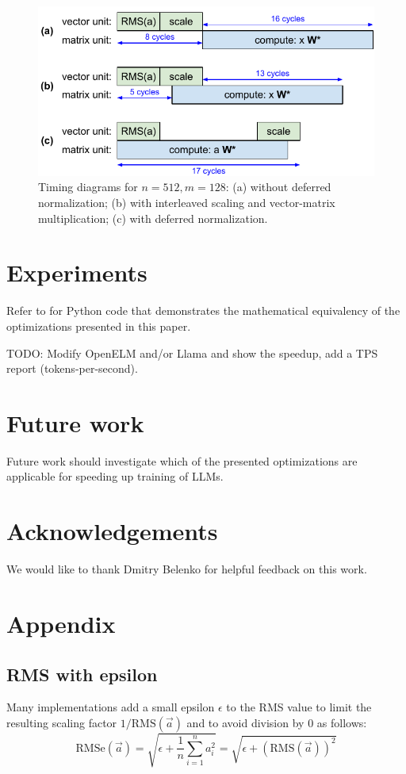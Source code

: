 \documentclass{article}
\numberwithin{equation}{section} %
\def\rms{\text{RMS}(\vec{a})}         %
\def\f1n{\frac{1}{n}}                 %
\def\sas{\sum_{i=1}^n a_i^2}          %
\def\a{\vec{a}}                       %
\begin{document}
\begin{figure}[h!] \centering
  \includegraphics[scale=0.9]{figs/flash_fig8.pdf}
  \caption{Timing diagrams for $n = 512, m = 128$: (a) without deferred normalization; (b) with interleaved scaling and vector-matrix multiplication; (c) with deferred normalization.}
\label{fig8} \end{figure}

\section{Experiments}
Refer to \cite{tricks} for Python code that demonstrates the mathematical equivalency of the optimizations presented in this paper.

TODO: Modify OpenELM and/or Llama and show the speedup, add a TPS report (tokens-per-second).

\section{Future work}
Future work should investigate which of the presented optimizations are applicable for speeding up training of LLMs.

\section*{Acknowledgements}
We would like to thank Dmitry Belenko for helpful feedback on this work.




\section*{Appendix}

\subsection*{RMS with epsilon}
Many implementations add a small epsilon $\epsilon$ to the RMS value to limit the resulting scaling factor $1/\rms$ and to avoid division by 0 as follows:
\begin{equation*}
 \text{RMSe}(\a) = \sqrt{\epsilon + \f1n \sas} = \sqrt{\epsilon + \left( \rms \right)^2}
\end{equation*}
\end{document}
